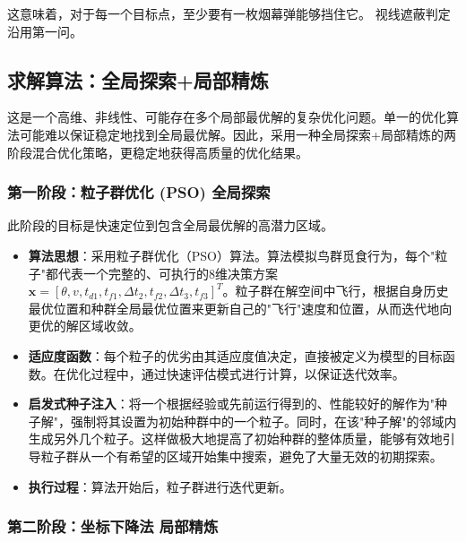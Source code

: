 \documentclass[5pt, withoutpreface,bwprint]{cumcmthesis} %
\begin{document}
     这意味着，对于每一个目标点，至少要有一枚烟幕弹能够挡住它。
     视线遮蔽判定沿用第一问。
     \subsection{求解算法：全局探索+局部精炼}
     
     
     这是一个高维、非线性、可能存在多个局部最优解的复杂优化问题。单一的优化算法可能难以保证稳定地找到全局最优解。因此，采用一种全局探索+局部精炼的两阶段混合优化策略，更稳定地获得高质量的优化结果。
     
     \subsubsection{第一阶段：粒子群优化 (PSO) 全局探索}
     
     此阶段的目标是快速定位到包含全局最优解的高潜力区域。
     
     \begin{itemize}
         \item \textbf{算法思想}：采用粒子群优化（PSO）算法。算法模拟鸟群觅食行为，每个"粒子"都代表一个完整的、可执行的8维决策方案 $\boldsymbol{x} = [\theta, v, t_{d1}, t_{f1}, \Delta t_{2}, t_{f2}, \Delta t_{3}, t_{f3}]^T$。粒子群在解空间中飞行，根据自身历史最优位置和种群全局最优位置来更新自己的"飞行"速度和位置，从而迭代地向更优的解区域收敛。
     
         \item \textbf{适应度函数}：每个粒子的优劣由其适应度值决定，直接被定义为模型的目标函数。在优化过程中，通过快速评估模式进行计算，以保证迭代效率。
     
         \item \textbf{启发式种子注入}：将一个根据经验或先前运行得到的、性能较好的解作为"种子解"，强制将其设置为初始种群中的一个粒子。同时，在该"种子解"的邻域内生成另外几个粒子。这样做极大地提高了初始种群的整体质量，能够有效地引导粒子群从一个有希望的区域开始集中搜索，避免了大量无效的初期探索。
     
         \item \textbf{执行过程}：算法开始后，粒子群进行迭代更新。
       
     \end{itemize}
     
     \subsubsection{第二阶段：坐标下降法 局部精炼}
     
\end{document}
